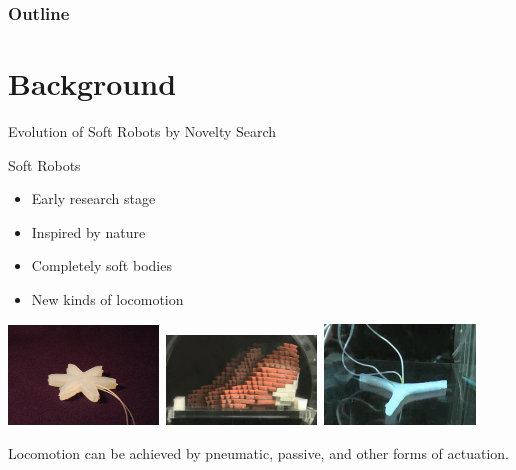 \documentclass[6pt]{beamer}
\begin{document}
\begin{frame}
\frametitle{Outline}
\tableofcontents
\end{frame}





\section{Background}

\begin{frame}{{\scriptsize Evolution of} Soft Robots {\scriptsize by Novelty Search}}
\begin{block}{Soft Robots}
\begin{itemize}
\item Early research stage
\item Inspired by nature
\item Completely soft bodies
\item New kinds of locomotion
\end{itemize}
\end{block}
\begin{center}
\includegraphics[width=0.3\textwidth,height=0.25\textheight]{../Figures/Misc/soft_robotics_figure.png}\		
\includegraphics[width=0.3\textwidth,height=0.25\textheight]{../Figures/Misc/hillerPressureChamber.png}\	
\includegraphics[width=0.3\textwidth,height=0.25\textheight]{../Figures/Misc/ExplodingRobot.jpg}\\
\end{center}
Locomotion can be achieved by pneumatic, passive, and other forms of actuation.
\end{frame}
\end{document}
